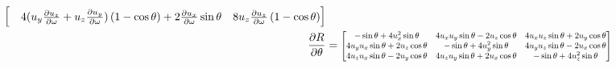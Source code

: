 \documentclass[12pt]{article}
\newcommand*{\Scale}[2][4]{\scalebox{#1}{$#2$}}%
\begin{document}
\begin{align}
{\begin{bmatrix}
& 4(u_y\frac{\partial u_z}{\partial\omega} +  u_z\frac{\partial u_y}{\partial\omega}) \left(1-\cos \theta\right) + 2\frac{\partial u_x}{\partial\omega} \sin \theta 
& 8u_z\frac{\partial u_z}{\partial\omega} \left(1-\cos \theta\right) \end{bmatrix}} \\
\frac{\partial R}{\partial\theta} &= \Scale[0.75]{\begin{bmatrix} 
-\sin \theta + 4u_x^2 \sin \theta 
& 4u_x u_y \sin \theta - 2u_z \cos \theta 
& 4u_x u_z \sin \theta + 2u_y \cos \theta 
\\ 4u_y u_x \sin \theta + 2u_z \cos \theta 
& -\sin \theta + 4u_y^2\sin \theta 
& 4u_y u_z \sin \theta - 2u_x \cos \theta 
\\ 4u_z u_x \sin \theta - 2u_y \cos \theta   
& 4u_z u_y \sin \theta + 2u_x \cos \theta 
& -\sin \theta + 4u_z^2\sin \theta 
\end{bmatrix}} 
\end{align}
\end{document}

